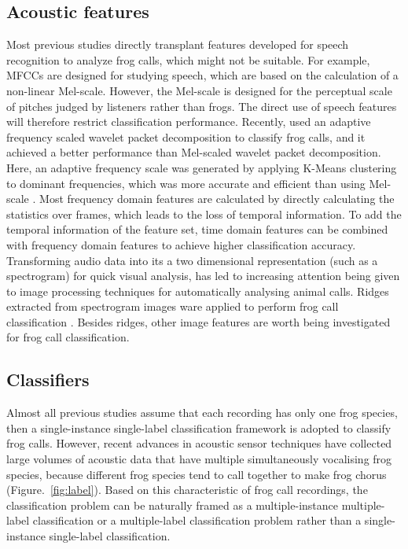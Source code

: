 \subsection{Acoustic features}
Most previous studies directly transplant features developed for speech recognition to analyze frog calls, which might not be suitable. For example, MFCCs are designed for studying speech, which are based on the calculation of a non-linear Mel-scale. However, the Mel-scale is designed for the perceptual scale of pitches judged by listeners rather than frogs. The direct use of speech features will therefore restrict classification performance. Recently, \cite{jie2015escience} used an adaptive frequency scaled wavelet packet decomposition to classify frog calls, and it achieved a better performance than Mel-scaled wavelet packet decomposition. Here, an adaptive frequency scale was generated by applying K-Means clustering to dominant frequencies, which was more accurate and efficient than using Mel-scale \citep{jie2015escience}.
Most frequency domain features are calculated by directly calculating the statistics over frames, which leads to the loss of temporal information. To add the temporal information of the feature set, time domain features can be combined with frequency domain features to achieve higher classification accuracy. Transforming audio data into its a two dimensional representation (such as a spectrogram) for quick visual analysis, has led to increasing attention being given to image processing techniques for automatically analysing animal calls. Ridges extracted from spectrogram images ware applied to perform frog call classification \citep{jie2015ICIP}. Besides ridges, other image features are worth being investigated for frog call classification.

\subsection{Classifiers}
Almost all previous studies assume that each recording has only one frog species, then a single-instance single-label classification framework is adopted to classify  frog calls. However, recent advances in acoustic sensor techniques have collected large volumes of acoustic data that have multiple simultaneously vocalising frog species, because different frog species tend to call together to make frog chorus (Figure.~\ref{fig:label}). Based on this characteristic of frog call recordings, the classification problem can be naturally framed as a multiple-instance multiple-label classification or a multiple-label classification problem rather than a single-instance single-label classification.


